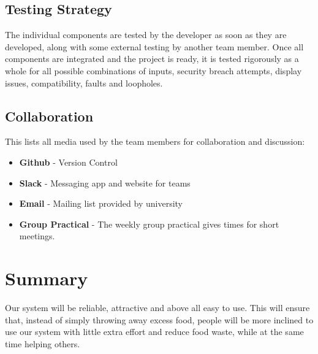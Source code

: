 \documentclass[12pt]{article}
\begin{document}
\subsection{Testing Strategy}

The individual components are tested by the developer as soon as they are developed, along with some external testing by another team member. Once all components are integrated and the project is ready, it is tested rigorously as a whole for all possible combinations of inputs, security breach attempts, display issues, compatibility, faults and loopholes.

\subsection{Collaboration}

This lists all media used by the team members for collaboration and discussion:

\begin{itemize}

\item \textbf{Github} - Version Control 


\item \textbf{Slack} - Messaging app and website for teams


\item \textbf{Email} - Mailing list provided by university


\item \textbf{Group Practical} - The weekly group practical gives times for short meetings.

\end{itemize}

\section{Summary}

Our system will be reliable, attractive and above all easy to use. This will ensure that, instead of simply throwing away excess food, people will be more inclined to use our system with little extra effort and reduce food waste, while at the same time helping others. 
\end{document}
